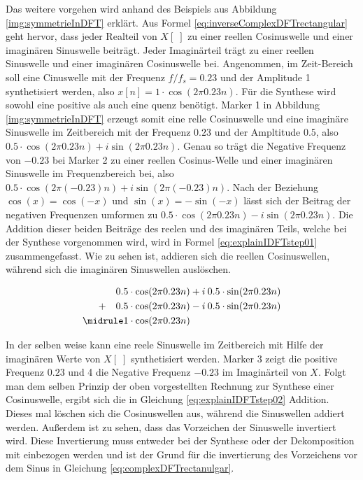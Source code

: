 Das weitere vorgehen wird anhand des Beispiels aus Abbildung \ref{img:symmetrieInDFT}  erklärt. Aus Formel \ref{eq:inverseComplexDFTrectangular} geht  hervor, dass jeder Realteil von $X[\;]$ zu einer reellen Cosinuswelle und einer imaginären Sinuswelle beiträgt. Jeder Imaginärteil trägt zu einer reellen Sinuswelle und einer imaginären Cosinuswelle bei. Angenommen, im Zeit-Bereich soll eine Cinuswelle mit der Frequenz $f/f_s = 0.23$ und der Amplitude 1 synthetisiert werden, also $ x[n] = 1 \cdot \cos(2  \pi 0.23 n)$. Für die Synthese wird sowohl eine positive als auch eine quenz benötigt. Marker 1 in Abbildung \ref{img:symmetrieInDFT} erzeugt somit eine relle Cosinuswelle und eine imaginäre Sinuswelle im Zeitbereich mit der Frequenz $0.23$ und der Ampltitude $0.5$, also $0.5 \cdot \cos(2  \pi 0.23 n) + i \sin(2  \pi 0.23 n)$. Genau so trägt die Negative Frequenz von $-0.23$ bei Marker 2 zu einer reellen Cosinus-Welle und einer imaginären Sinuswelle im Frequenzbereich bei, also $0.5 \cdot \cos(2  \pi (-0.23) n) + i \sin(2  \pi (-0.23) n)$. Nach der Beziehung $\cos(x) = \cos(-x) $ und $\sin(x) = -\sin(-x) $ lässt sich der Beitrag der negativen Frequenzen umformen zu $0.5 \cdot \cos(2  \pi 0.23 n) - i \sin(2  \pi 0.23 n)$. Die Addition dieser beiden Beiträge des reelen und des imaginären Teils, welche bei der Synthese vorgenommen wird, wird in Formel \ref{eq:explainIDFTstep01} zusammengefasst. Wie zu sehen ist, addieren sich die reellen Cosinuswellen, während sich die imaginären  Sinuswellen auslöschen. \cite[S. 573- 574]{dspGuide}

\begin{equation}
\begin{split}
0.5 \cdot \cos(2  \pi 0.23 n) + i \: 0.5 \cdot \sin(2  \pi 0.23 n) \\
+ \quad 0.5 \cdot \cos(2  \pi 0.23 n) - i \:  0.5 \cdot \sin(2  \pi 0.23 n) \\
\midrule
1 \cdot  \cos(2  \pi 0.23 n) \qquad \qquad \qquad \qquad \quad \;
\end{split}
\label{eq:explainIDFTstep01}
\end{equation}
 
 In der selben weise kann eine reele Sinuswelle im Zeitbereich mit Hilfe der imaginären Werte von $X[\;]$ synthetisiert werden. Marker 3 zeigt die positive Frequenz $0.23$ und 4 die Negative Frequenz $-0.23$ im Imaginärteil von $X$. Folgt man dem selben Prinzip der oben vorgestellten Rechnung zur Synthese einer Cosinuswelle, ergibt sich die in Gleichung \ref{eq:explainIDFTstep02} Addition. Dieses mal löschen sich die Cosinuswellen aus, während die Sinuswellen addiert werden. Außerdem ist zu sehen, dass das Vorzeichen der Sinuswelle invertiert wird.  Diese Invertierung muss entweder bei der Synthese oder der Dekomposition mit einbezogen werden und ist der Grund für die invertierung des Vorzeichens vor dem Sinus in Gleichung \ref{eq:complexDFTrectanulgar}. \cite[S. 574]{dspGuide} 
 

